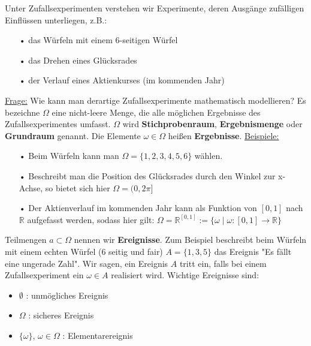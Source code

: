 \documentclass[12pt,fleqn]{report}
\begin{document}
Unter Zufallsexperimenten verstehen wir Experimente, deren Ausgänge zufälligen Einflüssen unterliegen, z.B.:
\begin{itemize}
\item[•] das Würfeln mit einem 6-seitigen Würfel
\item[•] das Drehen eines Glücksrades
\item[•] der Verlauf eines Aktienkurses (im kommenden Jahr)
\end{itemize}
\underline{Frage:}\newline
Wie kann man derartige Zufallsexperimente mathematisch modellieren?\newline
Es bezeichne $\Omega$ eine nicht-leere Menge, die alle möglichen Ergebnisse des Zufallsexperimentes umfasst. $\Omega$ wird \textbf{Stichprobenraum}, \textbf{Ergebnismenge} oder \textbf{Grundraum} genannt.\newline
Die Elemente $\omega \in \Omega$ heißen \textbf{Ergebnisse}.\newline
\newline
\underline{Beispiele:}
\begin{itemize}
\item[•] Beim Würfeln kann man $\Omega = \{1, 2, 3, 4, 5, 6\}$ wählen.
\item[•] Beschreibt man die Position des Glücksrades durch den Winkel zur x-Achse, so bietet sich hier $\Omega = (0,2\pi]$
\item[•] Der Aktienverlauf im kommenden Jahr kann als Funktion von $[0,1]$ nach $\mathbb{R}$ aufgefasst werden, sodass hier gilt:\newline 
			$\Omega = \mathbb{R}^{[0,1]} := \{\omega \mid \omega : [0,1] \rightarrow \mathbb{R}\}$
\end{itemize}
Teilmengen $a \subset \Omega$ nennen wir \textbf{Ereignisse}.
Zum Beispiel beschreibt beim Würfeln mit einem echten Würfel (6 seitig und fair) $A = \{1, 3, 5\}$ das Ereignis "Es fällt eine ungerade Zahl".
Wir sagen, ein Ereignis $A$ tritt ein, falls bei einem Zufallsexperiment ein $\omega \in A$ realisiert wird.
Wichtige Ereignisse sind:
\begin{itemize}
\item $\emptyset$ : unmögliches Ereignis
\item $\Omega$ : sicheres Ereignis
\item $\{\omega\}$, $\omega \in \Omega$ : Elementarereignis
\end{itemize}
\end{document}
